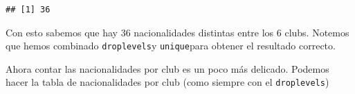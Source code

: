 \documentclass[]{article}
\newenvironment{Shaded}{\begin{snugshade}}{\end{snugshade}}
\newcommand{\CommentTok}[1]{\textcolor[rgb]{0.56,0.35,0.01}{\textit{#1}}}
\newcommand{\KeywordTok}[1]{\textcolor[rgb]{0.13,0.29,0.53}{\textbf{#1}}}
\newcommand{\NormalTok}[1]{#1}
\newcommand{\OperatorTok}[1]{\textcolor[rgb]{0.81,0.36,0.00}{\textbf{#1}}}
\begin{document}
\begin{Shaded}
\end{Shaded}

\begin{verbatim}
## [1] 36
\end{verbatim}

Con esto sabemos que hay 36 nacionalidades distintas entre los 6 clubs.
Notemos que hemos combinado \texttt{droplevels}y \texttt{unique}para
obtener el resultado correcto.

Ahora contar las nacionalidades por club es un poco más delicado.
Podemos hacer la tabla de nacionalidades por club (como siempre con el
\texttt{droplevels})

\begin{Shaded}
\end{Shaded}
\end{document}
